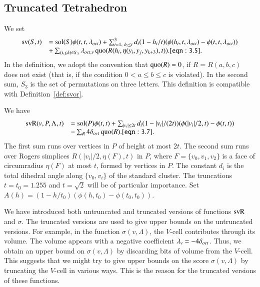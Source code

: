 \subsection{Truncated Tetrahedron}


We set
    \begin{equation}
    \begin{array}{lll}
    \op{sv}(S,t) &=
    \sol(S)\phi(t,t,\lambda_{oct})
    +\sum_{i=1,\ h_i\le t}^3 d_i (1-h_i/t) (\phi(h_i,t,\lambda_{oct})-
    \phi(t,t,\lambda_{oct})) \\
    &+\sum_{(i,j,k)\in S_3}
    \lambda_{oct,v}
    \quo(R(h_i,\eta(y_i,y_j,y_{k+3}),t)).
    \tlabel{eqn:3.5}
    \end{array}
    \end{equation}
In the definition, we adopt the convention that $\operatorname{quo}(R)=0$, if
$R=R(a,b,c)$ does not exist (that is, if the condition
    $0< a\le b\le c$
is violated). In the second sum, $S_3$ is the set of permutations
on three letters. This definition is compatible with
Definition~\ref{def:svor}.

We have
    \begin{equation}
    \begin{array}{lll}
    \op{svR}(v,P,\Lambda,t) &=
    \sol(P)\phi(t,t)
    +\sum_{|v_i|\le 2t} d_i (1-|v_i|/(2t)) (\phi(|v_i|/2,t)-
    \phi(t,t)) \\
    &-\sum_{R} 4\doct \quo(R).
    \tlabel{eqn:3.7}
    \end{array}
    \end{equation}
The first sum runs over vertices in $P$ of height at most $2t$.
The second sum runs over Rogers simplices $R(|v_i|/2,\eta(F),t)$
in $P$, where $F=\{v_0,v_1,v_2\}$ is a face of circumradius
$\eta(F)$ at most $t$, formed by vertices in $P$.  The constant
$d_i$ is the total dihedral angle along $\{v_0,v_i\}$ of the
standard cluster. The truncations $t=t_0=1.255$ and $t=\sqrt2$
will be of particular importance.
    Set $A(h) = (1-h/t_0) (\phi(h,t_0)-\phi(t_0,t_0))$.

\begin{remark}  We have introduced both untruncated and truncated
versions of functions ${\operatorname{svR}}$ and $\sigma$.  The truncated versions
are used to give upper bounds on the untruncated versions.  For
example,  in the function $\sigma(v,\Lambda)$, the $V$-cell contributes
through its volume.  The volume
appears with a negative coefficient 
$\lambda_v=-4\delta_{oct}$.  Thus, we obtain an
upper bound on $\sigma(v,\Lambda)$ by discarding bits of volume from the
$V$-cell.   This suggests that we might try to give upper bounds
on the score $\sigma(v,\Lambda)$ by truncating the $V$-cell in various
ways. This is the reason for the truncated versions of these
functions.
\end{remark}




